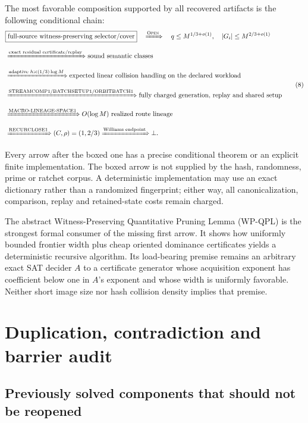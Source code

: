 \documentclass[11pt]{article}
\newcommand{\Open}{\textsc{Open}}
\begin{document}
The most favorable composition supported by all recovered artifacts is the
following conditional chain:
\[
\begin{aligned}
&\boxed{\text{full-source witness-preserving selector/cover}}
\quad\xRightarrow{\Open}\quad
q\le M^{1/3+o(1)},\quad |G_i|\le M^{2/3+o(1)}
\\[2mm]
&\xRightarrow{\text{exact residual certificate/replay}}
\text{sound semantic classes}
\\[2mm]
&\xRightarrow{\text{adaptive }h\asymp(1/3)\log M}
\text{expected linear collision handling on the declared workload}
\\[2mm]
&\xRightarrow{\text{STREAMCOMP1/BATCHSETUP1/ORBITBATCH1}}
\text{fully charged generation, replay and shared setup}
\\[2mm]
&\xRightarrow{\text{MACRO-LINEAGE-SPACE1}}
O(\log M)\text{ realized route lineage}
\\[2mm]
&\xRightarrow{\text{RECURCLOSE1}}
(C,\rho)=(1,2/3)
\xRightarrow{\text{Williams endpoint}}
\bot.
\end{aligned}                                                     \tag{8}
\]

Every arrow after the boxed one has a precise conditional theorem or an
explicit finite implementation.  The boxed arrow is not supplied by the hash,
randomness, prime or ratchet corpus.  A deterministic implementation may use
an exact dictionary rather than a randomized fingerprint; either way, all
canonicalization, comparison, replay and retained-state costs remain charged.

The abstract Witness-Preserving Quantitative Pruning Lemma (WP-QPL) is the
strongest formal consumer of the missing first arrow.  It shows how uniformly
bounded frontier width plus cheap oriented dominance certificates yields a
deterministic recursive algorithm.  Its load-bearing premise remains an
arbitrary exact SAT decider $A$ to a certificate generator whose acquisition
exponent has coefficient below one in $A$'s exponent and whose width is
uniformly favorable.  Neither short image size nor hash collision density
implies that premise.

\section{Duplication, contradiction and barrier audit}

\subsection{Previously solved components that should not be reopened}
\end{document}
